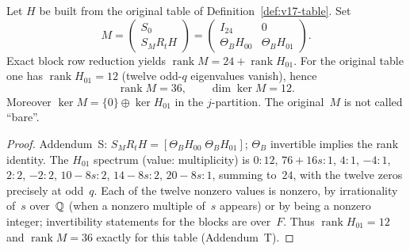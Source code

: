 \begin{theorem}\label{thm:v17-M36}
Let $H$ be built from the original table of Definition~\ref{def:v17-table}. Set
\[
M=\begin{pmatrix}S_0\\ S_M R_t H\end{pmatrix}
=\begin{pmatrix}I_{24}&0\\ \Theta_B H_{00}& \Theta_B H_{01}\end{pmatrix}.
\]
Exact block row reduction yields $\operatorname{rank} M=24+\operatorname{rank} H_{01}$. For the original table one has $\operatorname{rank} H_{01}=12$ (twelve odd-$q$ eigenvalues vanish), hence
\[
\operatorname{rank} M=36,\qquad \dim\ker M=12.
\]
Moreover $\ker M=\{0\}\oplus\ker H_{01}$ in the $j$-partition. The original~$M$ is not called ``bare''.
\end{theorem}
\begin{proof}
Addendum~S: $S_MR_tH=[\Theta_B H_{00}\;\Theta_B H_{01}]$; $\Theta_B$ invertible implies the rank identity. The $H_{01}$ spectrum (value: multiplicity) is $0{:}12$, $76+16s{:}1$, $4{:}1$, $-4{:}1$, $2{:}2$, $-2{:}2$, $10-8s{:}2$, $14-8s{:}2$, $20-8s{:}1$, summing to~$24$, with the twelve zeros precisely at odd~$q$. Each of the twelve nonzero values is nonzero, by irrationality of~$s$ over~$\mathbb{Q}$ (when a nonzero multiple of~$s$ appears) or by being a nonzero integer; invertibility statements for the blocks are over~$F$. Thus $\operatorname{rank} H_{01}=12$ and $\operatorname{rank} M=36$ exactly for this table (Addendum~T).
\end{proof}

